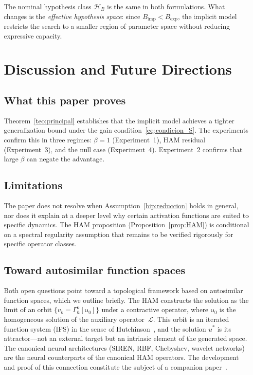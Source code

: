 \documentclass[12pt]{article}
\begin{document}
The nominal hypothesis class $\mathcal{H}_B$ is the same in both
formulations.
What changes is the \emph{effective hypothesis space}: since
$B_{\mathrm{imp}} < B_{\mathrm{exp}}$, the implicit model restricts
the search to a smaller region of parameter space without reducing
expressive capacity.

\section{Discussion and Future Directions}
\label{sec:discussion}

\subsection{What this paper proves}

Theorem~\ref{teo:principal} establishes that the implicit model
achieves a tighter generalization bound under the gain
condition~\eqref{eq:condicion_S}.
The experiments confirm this in three regimes: $\beta = 1$
(Experiment~1), HAM residual (Experiment~3), and the null case
(Experiment~4).
Experiment~2 confirms that large $\beta$ can negate the advantage.

\subsection{Limitations}

The paper does not resolve when Assumption~\ref{hip:reduccion} holds
in general, nor does it explain at a deeper level why certain
activation functions are suited to specific dynamics.
The HAM proposition (Proposition~\ref{prop:HAM}) is conditional on a
spectral regularity assumption that remains to be verified
rigorously for specific operator classes.

\subsection{Toward autosimilar function spaces}

Both open questions point toward a topological framework based on
autosimilar function spaces, which we outline briefly.
The HAM constructs the solution as the limit of an orbit
$\{v_k = \Gamma_\hbar^k[u_0]\}$ under a contractive operator,
where $u_0$ is the homogeneous solution of the auxiliary
operator~$\mathcal{L}$.
This orbit is an iterated function system (IFS) in the sense of
Hutchinson~\cite{Hutchinson1981}, and the solution $u^*$ is its
attractor---not an external target but an intrinsic element of the
generated space.
The canonical neural architectures (SIREN, RBF, Chebyshev, wavelet
networks) are the neural counterparts of the canonical HAM operators.
The development and proof of this connection constitute the subject
of a companion paper~\cite{Rodrigo2026companion}.
\end{document}
